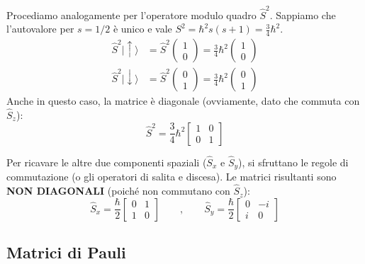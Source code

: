 \documentclass[11pt, a4paper]{article}
\begin{document}
\noindent
Procediamo analogamente per l'operatore modulo quadro $\hat{S}^2$. Sappiamo che l'autovalore per $s=1/2$ è unico e vale $S^2 = \hbar^2 s(s+1) = \frac{3}{4}\hbar^2$. %
\begin{align*}
    \hat{S}^2 |\uparrow\rangle &= \hat{S}^2 \begin{pmatrix} 1 \\ 0 \end{pmatrix} = \frac{3}{4}\hbar^2 \begin{pmatrix} 1 \\ 0 \end{pmatrix} \\ %
    \hat{S}^2 |\downarrow\rangle &= \hat{S}^2 \begin{pmatrix} 0 \\ 1 \end{pmatrix} = \frac{3}{4}\hbar^2 \begin{pmatrix} 0 \\ 1 \end{pmatrix} %
\end{align*}
Anche in questo caso, la matrice è diagonale (ovviamente, dato che commuta con $\hat{S}_z$): %
\begin{equation}
    \boxed{ \hat{S}^2 = \frac{3}{4}\hbar^2 \begin{bmatrix} 1 & 0 \\ 0 & 1 \end{bmatrix} } %
\end{equation}
    
\noindent 
Per ricavare le altre due componenti spaziali ($\hat{S}_x$ e $\hat{S}_y$), si sfruttano le regole di commutazione (o gli operatori di salita e discesa). Le matrici risultanti sono \textbf{NON DIAGONALI} (poiché non commutano con $\hat{S}_z$): %
\begin{equation}
    \hat{S}_x = \frac{\hbar}{2} \begin{bmatrix} 0 & 1 \\ 1 & 0 \end{bmatrix} \qquad , \qquad \hat{S}_y = \frac{\hbar}{2} \begin{bmatrix} 0 & -i \\ i & 0 \end{bmatrix} %
\end{equation}

\subsection{Matrici di Pauli} %
\end{document}

